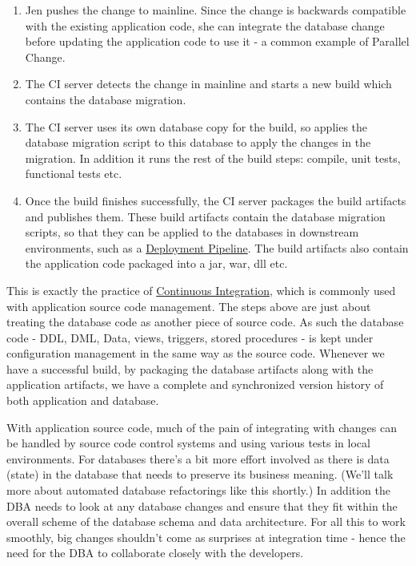 \documentclass[12pt]{article}
\begin{document}
\begin{enumerate}
      \item Jen pushes the change to mainline. Since the change is
        backwards compatible with the existing application code, she can
        integrate the database change before updating the application
        code to use it - a common example of Parallel Change.

      \item The CI server detects the change in mainline and starts a
        new build which contains the database migration.

      \item The CI server uses its own database copy for the build, so
        applies the database migration script to this database to apply
        the changes in the migration. In addition it runs the rest of
        the build steps: compile, unit tests, functional tests etc.

      \item Once the build finishes successfully, the CI server packages
        the build artifacts and publishes them. These build artifacts
        contain the database migration scripts, so that they can be
        applied to the databases in downstream environments, such as a
        \href{https://martinfowler.com/bliki/DeploymentPipeline.html}{Deployment
        Pipeline}. The build artifacts also contain the application code
        packaged into a jar, war, dll etc.

\end{enumerate}

This is exactly the practice of
\href{https://martinfowler.com/articles/continuousIntegration.html}{Continuous
Integration}, which is commonly used with application source code
management. The steps above are just about treating the database code as
another piece of source code. As such the database code - DDL, DML,
Data, views, triggers, stored procedures - is kept under configuration
management in the same way as the source code. Whenever we have a
successful build, by packaging the database artifacts along with the
application artifacts, we have a complete and synchronized version
history of both application and database.

With application source code, much of the pain of integrating with
changes can be handled by source code control systems and using various
tests in local environments. For databases there's a bit more effort
involved as there is data (state) in the database that needs to preserve
its business meaning. (We'll talk more about automated database
refactorings like this shortly.) In addition the DBA needs to look at
any database changes and ensure that they fit within the overall scheme
of the database schema and data architecture. For all this to work
smoothly, big changes shouldn't come as surprises at integration time -
hence the need for the DBA to collaborate closely with the developers.
\end{document}
